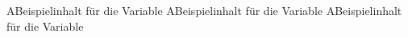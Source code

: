 \nomenclature[aA]A{Beispielinhalt für die Variable}
\nomenclature[xA]A{Beispielinhalt für die Variable}
\nomenclature[zA]A{Beispielinhalt für die Variable}
